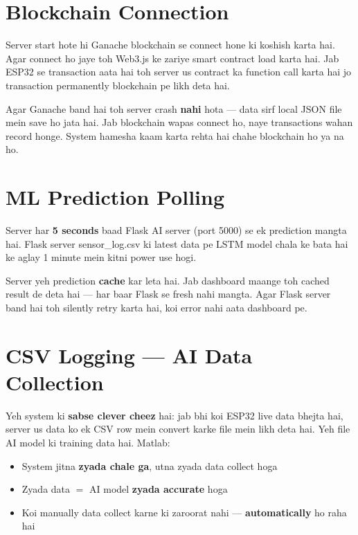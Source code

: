 \section{Blockchain Connection}

Server start hote hi Ganache blockchain se connect hone ki koshish karta hai. Agar connect ho jaye toh Web3.js ke zariye smart contract load karta hai. Jab ESP32 se transaction aata hai toh server us contract ka function call karta hai jo transaction permanently blockchain pe likh deta hai.

\begin{tipbox}
Agar Ganache band hai toh server crash \textbf{nahi} hota --- data sirf local JSON file mein save ho jata hai. Jab blockchain wapas connect ho, naye transactions wahan record honge. System hamesha kaam karta rehta hai chahe blockchain ho ya na ho.
\end{tipbox}

\section{ML Prediction Polling}

Server har \textbf{5 seconds} baad Flask AI server (port 5000) se ek prediction mangta hai. Flask server sensor\_log.csv ki latest data pe LSTM model chala ke bata hai ke aglay 1 minute mein kitni power use hogi.

Server yeh prediction \textbf{cache} kar leta hai. Jab dashboard maange toh cached result de deta hai --- har baar Flask se fresh nahi mangta. Agar Flask server band hai toh silently retry karta hai, koi error nahi aata dashboard pe.

\section{CSV Logging --- AI Data Collection}

Yeh system ki \textbf{sabse clever cheez} hai: jab bhi koi ESP32 live data bhejta hai, server us data ko ek CSV row mein convert karke file mein likh deta hai. Yeh file AI model ki training data hai. Matlab:

\begin{itemize}[nosep]
    \item System jitna \textbf{zyada chale ga}, utna zyada data collect hoga
    \item Zyada data $=$ AI model \textbf{zyada accurate} hoga
    \item Koi manually data collect karne ki zaroorat nahi --- \textbf{automatically} ho raha hai
\end{itemize}

